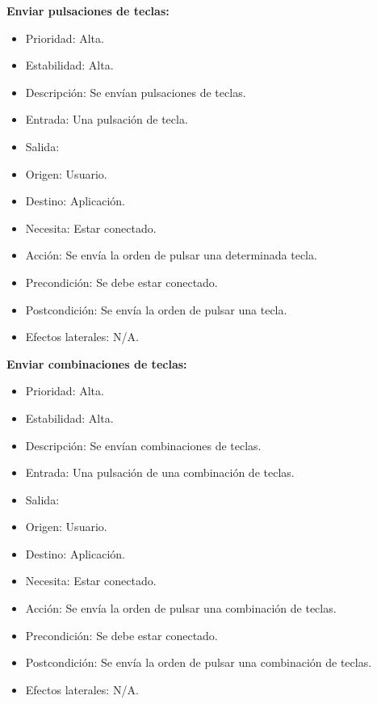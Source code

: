 \textbf{Enviar pulsaciones de teclas:}
\begin{itemize}
\item Prioridad: Alta.
\item Estabilidad: Alta.
\item Descripción: Se envían pulsaciones de teclas.
\item Entrada: Una pulsación de tecla.
\item Salida:
\item Origen: Usuario.
\item Destino: Aplicación.
\item Necesita: Estar conectado.
\item Acción: Se envía la orden de pulsar una determinada tecla.
\item Precondición: Se debe estar conectado.
\item Postcondición: Se envía la orden de pulsar una tecla.
\item Efectos laterales: N/A.\\

\end{itemize}

\textbf{Enviar combinaciones de teclas:}
\begin{itemize}
\item Prioridad: Alta.
\item Estabilidad: Alta.
\item Descripción: Se envían combinaciones de teclas.
\item Entrada: Una pulsación de una combinación de teclas.
\item Salida:
\item Origen: Usuario.
\item Destino: Aplicación.
\item Necesita: Estar conectado.
\item Acción: Se envía la orden de pulsar una combinación de teclas.
\item Precondición: Se debe estar conectado.
\item Postcondición: Se envía la orden de pulsar una combinación de teclas.
\item Efectos laterales: N/A.\\

\end{itemize}

